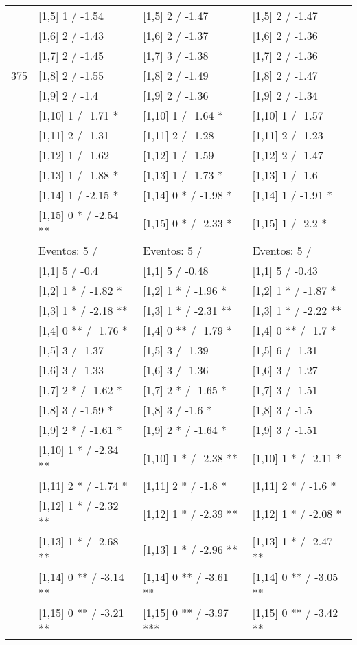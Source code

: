 \begin{table}
\begin{tabular}[t]{llll}
 & {}[1,5] 1  / -1.54 & {}[1,5] 2  / -1.47 & {}[1,5] 2  / -1.47\\
 & {}[1,6] 2  / -1.43 & {}[1,6] 2  / -1.37 & {}[1,6] 2  / -1.36\\
 & {}[1,7] 2  / -1.45 & {}[1,7] 3  / -1.38 & {}[1,7] 2  / -1.36\\
375 & {}[1,8] 2  / -1.55 & {}[1,8] 2  / -1.49 & {}[1,8] 2  / -1.47\\
\addlinespace
 & {}[1,9] 2  / -1.4 & {}[1,9] 2  / -1.36 & {}[1,9] 2  / -1.34\\
 & {}[1,10] 1  / -1.71 * & {}[1,10] 1  / -1.64 * & {}[1,10] 1  / -1.57\\
 & {}[1,11] 2  / -1.31 & {}[1,11] 2  / -1.28 & {}[1,11] 2  / -1.23\\
 & {}[1,12] 1  / -1.62 & {}[1,12] 1  / -1.59 & {}[1,12] 2  / -1.47\\
 & {}[1,13] 1  / -1.88 * & {}[1,13] 1  / -1.73 * & {}[1,13] 1  / -1.6\\
\addlinespace
 & {}[1,14] 1  / -2.15 * & {}[1,14] 0 * / -1.98 * & {}[1,14] 1  / -1.91 *\\
 & {}[1,15] 0 * / -2.54 ** & {}[1,15] 0 * / -2.33 * & {}[1,15] 1  / -2.2 *\\
 & Eventos:  5 / & Eventos:  5 / & Eventos:  5 /\\
 & {}[1,1] 5  / -0.4 & {}[1,1] 5  / -0.48 & {}[1,1] 5  / -0.43\\
 & {}[1,2] 1 * / -1.82 * & {}[1,2] 1 * / -1.96 * & {}[1,2] 1 * / -1.87 *\\
\addlinespace
 & {}[1,3] 1 * / -2.18 ** & {}[1,3] 1 * / -2.31 ** & {}[1,3] 1 * / -2.22 **\\
 & {}[1,4] 0 ** / -1.76 * & {}[1,4] 0 ** / -1.79 * & {}[1,4] 0 ** / -1.7 *\\
 & {}[1,5] 3  / -1.37 & {}[1,5] 3  / -1.39 & {}[1,5] 6  / -1.31\\
 & {}[1,6] 3  / -1.33 & {}[1,6] 3  / -1.36 & {}[1,6] 3  / -1.27\\
 & {}[1,7] 2 * / -1.62 * & {}[1,7] 2 * / -1.65 * & {}[1,7] 3  / -1.51\\
\addlinespace
500 & {}[1,8] 3  / -1.59 * & {}[1,8] 3  / -1.6 * & {}[1,8] 3  / -1.5\\
 & {}[1,9] 2 * / -1.61 * & {}[1,9] 2 * / -1.64 * & {}[1,9] 3  / -1.51\\
 & {}[1,10] 1 * / -2.34 ** & {}[1,10] 1 * / -2.38 ** & {}[1,10] 1 * / -2.11 *\\
 & {}[1,11] 2 * / -1.74 * & {}[1,11] 2 * / -1.8 * & {}[1,11] 2 * / -1.6 *\\
 & {}[1,12] 1 * / -2.32 ** & {}[1,12] 1 * / -2.39 ** & {}[1,12] 1 * / -2.08 *\\
\addlinespace
 & {}[1,13] 1 * / -2.68 ** & {}[1,13] 1 * / -2.96 ** & {}[1,13] 1 * / -2.47 **\\
 & {}[1,14] 0 ** / -3.14 ** & {}[1,14] 0 ** / -3.61 ** & {}[1,14] 0 ** / -3.05 **\\
 & {}[1,15] 0 ** / -3.21 ** & {}[1,15] 0 ** / -3.97 *** & {}[1,15] 0 ** / -3.42 **\\
\bottomrule
\end{tabular}
\end{table}
